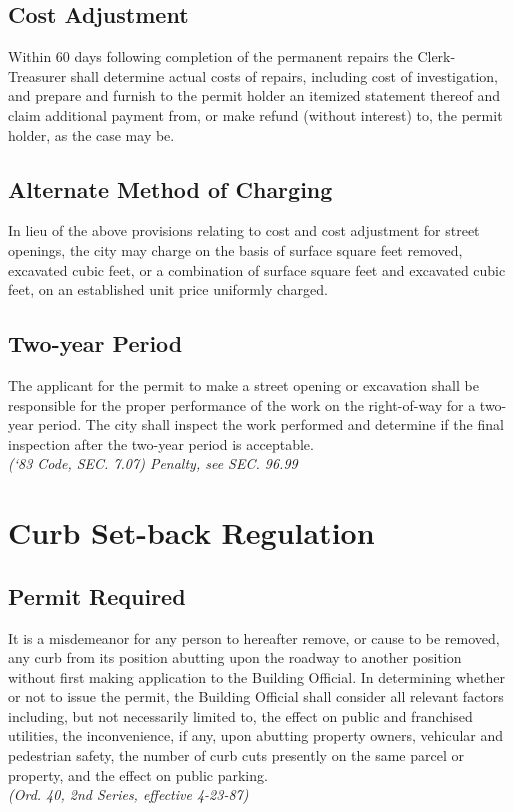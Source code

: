 \subsection{Cost Adjustment}
Within 60 days following completion of the permanent repairs the Clerk-Treasurer shall determine actual costs of repairs, including cost of investigation, and prepare and furnish to the permit holder an itemized statement thereof and claim additional payment from, or make refund (without interest) to, the permit holder, as the case may be.
\subsection{Alternate Method of Charging}
In lieu of the above provisions relating to cost and cost adjustment for street openings, the city may charge on the basis of surface square feet removed, excavated cubic feet, or a combination of surface square feet and excavated cubic feet, on an established unit price uniformly charged.
\subsection{Two-year Period}
The applicant for the permit to make a street opening or excavation shall be responsible for the proper performance of the work on the right-of-way for a two-year period.  The city shall inspect the work performed and determine if the final inspection after the two-year period is acceptable.\\
\emph{(‘83 Code, SEC. 7.07)  Penalty, see SEC. 96.99}
\section{Curb Set-back Regulation}
\subsection{Permit Required}
It is a misdemeanor for any person to hereafter remove, or cause to be removed, any curb from its position abutting upon the roadway to another position without first making application to the Building Official.  In determining whether or not to issue the permit, the Building Official shall consider all relevant factors including, but not necessarily limited to, the effect on public and franchised utilities, the inconvenience, if any, upon abutting property owners, vehicular and pedestrian safety, the number of curb cuts presently on the same parcel or property, and the effect on public parking.\\
\emph{(Ord. 40, 2nd Series, effective 4-23-87)}
